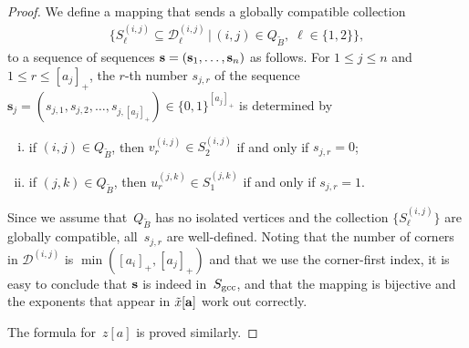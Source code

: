 \documentclass[pdftex]{sigma}
\numberwithin{equation}{section}
\begin{document}
\begin{proof}
We def\/ine a mapping that sends a globally compatible collection
\begin{gather*}
\big\{S_\ell^{(i,j)} \subseteq\mathcal{D}^{(i,j)}_\ell\,\big|\,  (i,j)\in Q_{\tilde B},\; \ell\in\{1,2\}\big\},
\end{gather*}
to a sequence of sequences ${\bf s}=({\bf s}_1,\dots,{\bf s}_n)$ as follows. For $1\le j\le n$ and $1\le r\le [a_j]_+$, the $r$-th number $s_{j,r}$ of the sequence $\mathbf{s}_j=(s_{j,1}, s_{j,2},\dots,s_{j,[a_j]_+})\in\{0,1\}^{[a_j]_+}$ is determined by
\begin{enumerate}[(i)]\itemsep=0pt
\item if $(i,j)\in Q_{\tilde B}$, then $v^{(i,j)}_r\in S^{(i,j)}_2$ if and only if $s_{j,r}=0$;
\item if $(j,k)\in Q_{\tilde B}$, then $u^{(j,k)}_r\in S^{(j,k)}_1$ if and only if $s_{j,r}=1$.
\end{enumerate}
Since we assume that~$Q_{\tilde B}$ has no isolated vertices and the collection $\{S_\ell^{(i,j)}\}$ are globally compatible,  all~$s_{j,r}$ are well-def\/ined. Noting that the number of corners in $\mathcal{D}^{(i,j)}$ is $\min([a_i]_+,[a_j]_+)$ and that we use the corner-f\/irst index, it is easy to conclude that ${\bf s}$ is indeed in~$S_{\rm gcc}$, and that the mapping is bijective and the exponents that appear in $\tilde{x}[{\bf a}]$ work out correctly.

The formula for~$z[a]$ is proved similarly.
\end{proof}
\end{document}

